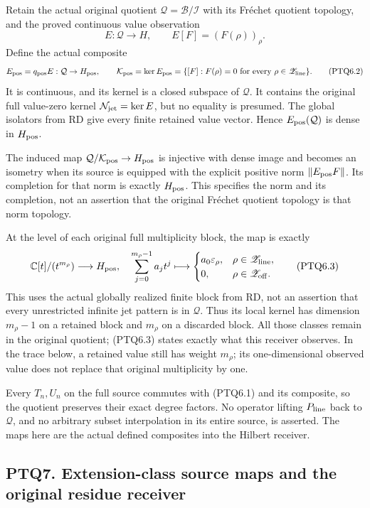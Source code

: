 Retain the actual original quotient \(\mathcal Q=\mathcal B/\mathcal I\)
with its Fréchet quotient topology, and the proved continuous value
observation \[
E:\mathcal Q\to H,\qquad E[F]=(F(\rho))_\rho.
\tag{PTQ6.1}
\] Define the actual composite \[
E_{\rm pos}=q_{\rm pos}E:\mathcal Q\to H_{\rm pos},
\qquad
\mathcal K_{\rm pos}=\ker E_{\rm pos}
=\{[F]:F(\rho)=0\text{ for every }\rho\in\mathscr Z_{\rm line}\}.
\tag{PTQ6.2}
\] It is continuous, and its kernel is a closed subspace of
\(\mathcal Q\). It contains the original full value-zero kernel
\(\mathcal N_{\rm jet}=\ker E\), but no equality is presumed. The global
isolators from RD give every finite retained value vector. Hence
\(E_{\rm pos}(\mathcal Q)\) is dense in \(H_{\rm pos}\).

The induced map \(\mathcal Q/\mathcal K_{\rm pos}\to H_{\rm pos}\) is
injective with dense image and becomes an isometry when its source is
equipped with the explicit positive norm \(\|E_{\rm pos}F\|\). Its
completion for that norm is exactly \(H_{\rm pos}\). This specifies the
norm and its completion, not an assertion that the original Fréchet
quotient topology is that norm topology.

At the level of each original full multiplicity block, the map is
exactly \[
\mathbb C[t]/(t^{m_\rho})\longrightarrow H_{\rm pos},
\quad
\sum_{j=0}^{m_\rho-1}a_jt^j
\longmapsto
\begin{cases}
a_0\varepsilon_\rho,&\rho\in\mathscr Z_{\rm line},\\
0,&\rho\in\mathscr Z_{\rm off}.
\end{cases}
\tag{PTQ6.3}
\] This uses the actual globally realized finite block from RD, not an
assertion that every unrestricted infinite jet pattern is in
\(\mathcal Q\). Thus its local kernel has dimension \(m_\rho-1\) on a
retained block and \(m_\rho\) on a discarded block. All those classes
remain in the original quotient; (PTQ6.3) states exactly what this
receiver observes. In the trace below, a retained value still has weight
\(m_\rho\); its one-dimensional observed value does not replace that
original multiplicity by one.

Every \(T_n,U_n\) on the full source commutes with (PTQ6.1) and its
composite, so the quotient preserves their exact degree factors. No
operator lifting \(P_{\rm line}\) back to \(\mathcal Q\), and no
arbitrary subset interpolation in its entire source, is asserted. The
maps here are the actual defined composites into the Hilbert receiver.

\subsection{PTQ7. Extension-class source maps and the original residue
receiver}\label{ptq7.-extension-class-source-maps-and-the-original-residue-receiver}


